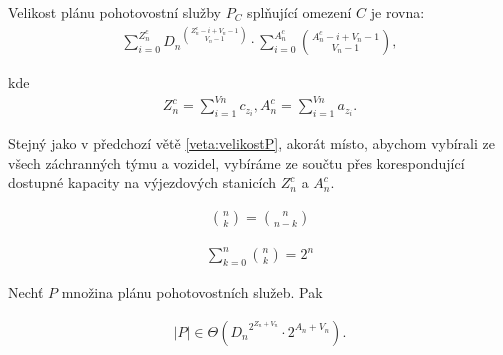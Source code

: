 \begin{veta}
  Velikost plánu pohotovostní služby $P_C$ splňující omezení $C$ je rovna:
  \begin{align*}
    \sum_{i=0}^{Z^c_n}{{D_n}^{\binom{Z^c_n - i + V_n - 1}{V_n - 1}}} \cdot \sum_{i = 0}^{A^c_n}\binom{A^c_n - i + V_n - 1}{V_n - 1},
  \end{align*}

  kde
  \begin{align*}
    Z^c_n = \sum_{i=1}^{Vn} c_{z_{i}}, A^c_n = \sum_{i=1}^{Vn} a_{z_{i}}.
  \end{align*}
\end{veta}

\begin{dukaz}
  Stejný jako v předchozí větě \ref{veta:velikostP}, akorát místo, abychom vybírali ze všech záchranných týmu a vozidel,
  vybíráme ze součtu přes korespondující dostupné kapacity na výjezdových stanicích $Z^c_n$ a $A^c_n$.
\end{dukaz}

\begin{lemma}\label{lemma:identitaKomb}
  \begin{align*}
    \binom{n}{k} = \binom{n}{n - k}
  \end{align*}
\end{lemma}

\begin{lemma}\label{lemma:sumaKomb}
  \begin{align*}
    \sum_{k=0}^n \binom{n}{k} = 2^n
  \end{align*}
\end{lemma}

\begin{veta}\label{veta:asymptotP}
  Nechť $P$ množina plánu pohotovostních služeb. Pak 

  \begin{align*}
    |P| \in \Theta({D_n}^{2^{Z_n + V_n}} \cdot 2^{A_n + V_n}).
  \end{align*}
\end{veta}

